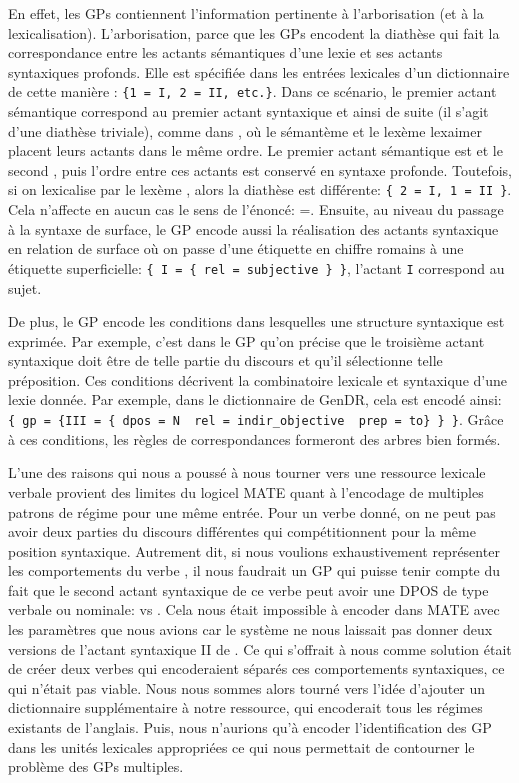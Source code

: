 En effet, les \acp{GP} contiennent l'information pertinente à l'arborisation (et à la lexicalisation). L'arborisation, parce que les \acp{GP} encodent la diathèse qui fait la correspondance entre les actants sémantiques d'une lexie et ses actants syntaxiques profonds. Elle est spécifiée dans les entrées lexicales d'un dictionnaire de cette manière : \lstinline|{1 = I, 2 = II, etc.}|. Dans ce scénario, le premier actant sémantique correspond au premier actant syntaxique et ainsi de suite (il s'agit d'une diathèse triviale), comme dans , où le sémantème  et le lexème lex{aimer} placent leurs actants dans le même ordre. Le premier actant sémantique est  et le second , puis l'ordre entre ces actants est conservé en syntaxe profonde. Toutefois, si on lexicalise  par le lexème , alors la diathèse est différente: \lstinline|{ 2 = I, 1 = II }|. Cela n'affecte en aucun cas le sens de l'énoncé: =. Ensuite, au niveau du passage à la syntaxe de surface, le \ac{GP} encode aussi la réalisation des actants syntaxique en relation de surface où on passe d'une étiquette en chiffre romains à une étiquette superficielle: \lstinline|{ I = { rel = subjective } }|, l'actant \texttt{I} correspond au sujet.

De plus, le \ac{GP} encode les conditions dans lesquelles une structure syntaxique est exprimée. Par exemple, c'est dans le \ac{GP} qu'on précise que le troisième actant syntaxique doit être de telle partie du discours et qu'il sélectionne telle préposition. Ces conditions décrivent la combinatoire lexicale et syntaxique d'une lexie donnée. Par exemple, dans le dictionnaire de GenDR, cela est encodé ainsi: \lstinline|{ gp = {III = { dpos = N  rel = indir_objective  prep = to} } }|. Grâce à ces conditions, les règles de correspondances formeront des arbres bien formés.

L'une des raisons qui nous a poussé à nous tourner vers une ressource lexicale verbale provient des limites du logicel MATE quant à l'encodage de multiples patrons de régime pour une même entrée. Pour un verbe donné, on ne peut pas avoir deux parties du discours différentes qui compétitionnent pour la même position syntaxique. Autrement dit, si nous voulions exhaustivement représenter les comportements du verbe , il nous faudrait un \ac{GP} qui puisse tenir compte du fait que le second actant syntaxique de ce verbe peut avoir une \ac{DPOS} de type verbale ou nominale:  vs . Cela nous était impossible à encoder dans MATE avec les paramètres que nous avions car le système ne nous laissait pas donner deux versions de l'actant syntaxique II de . Ce qui s'offrait à nous comme solution était de créer deux verbes  qui encoderaient séparés ces comportements syntaxiques, ce qui n'était pas viable. Nous nous sommes alors tourné vers l'idée d'ajouter un dictionnaire supplémentaire à notre ressource, qui encoderait tous les régimes existants de l'anglais. Puis, nous n'aurions qu'à encoder l'identification des \ac{GP} dans les unités lexicales appropriées ce qui nous permettait de contourner le problème des \acp{GP} multiples.

